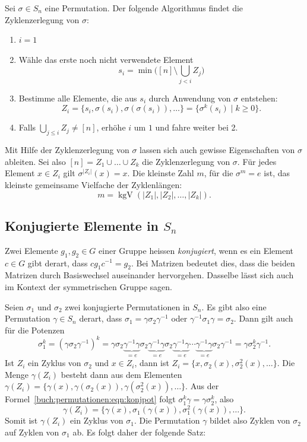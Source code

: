 \begin{satz}
Sei $\sigma\in S_n$ eine Permutation. Der folgende Algorithmus findet
die Zyklenzerlegung von $\sigma$:
\begin{enumerate}
\item
$i=1$
\item
Wähle das erste noch nicht verwendete Element
\[
s_i=\min\biggl( [n] \setminus \bigcup_{j< i} Z_j\biggr)
\]
\item
Bestimme alle Elemente, die aus $s_i$ durch Anwendung von $\sigma$
entstehen:
\[
Z_i
=
\{ s_i, \sigma(s_i), \sigma(\sigma(s_i)), \dots \}
=
\{\sigma^k(s_i) \mid k\ge 0\}.
\]
\item
Falls $\bigcup_{j\le i} Z_j\ne [n]$, erhöhe $i$ um $1$ und fahre 
weiter bei 2.
\end{enumerate}
\end{satz}

Mit Hilfe der Zyklenzerlegung von $\sigma$ lassen sich auch
gewisse Eigenschaften von $\sigma$ ableiten.
Sei also $[n] = Z_1\cup\dots\cup Z_k$ die Zyklenzerlegung von $\sigma$.
Für jedes Element $x\in Z_i$ gilt $\sigma^{|Z_i|}(x) = x$.
Die kleinste Zahl $m$, für die $\sigma^m=e$ ist, das kleinste
gemeinsame Vielfache der Zyklenlängen:
\[
m = \operatorname{kgV} (|Z_1|,|Z_2|,\dots,|Z_k|).
\]

\subsection{Konjugierte Elemente in $S_n$}
Zwei Elemente $g_1,g_2\in G$ einer Gruppe heissen {\em konjugiert}, wenn
es ein Element $c\in G$ gibt derart, dass $cg_1c^{-1}=g_2$.
Bei Matrizen bedeutet dies, dass die beiden Matrizen durch
Basiswechsel auseinander hervorgehen.
Dasselbe lässt sich auch im Kontext der symmetrischen Gruppe sagen.

Seien $\sigma_1$ und $\sigma_2$ zwei konjugierte Permutationen in $S_n$.
Es gibt also eine Permutation $\gamma\in S_n$ derart, dass
$\sigma_1=\gamma\sigma_2\gamma^{-1}$ oder $\gamma^{-1}\sigma_1\gamma=\sigma_2$.
Dann gilt auch für die Potenzen
\begin{equation}
\sigma_1^k
=
(\gamma\sigma_2\gamma^{-1})^k
=
\gamma\sigma_2\underbrace{\gamma^{-1}
\gamma}_{\displaystyle=e}\sigma_2\underbrace{\gamma^{-1}
\gamma}_{\displaystyle=e}\sigma_2\underbrace{\gamma^{-1}\gamma}_{\displaystyle=e}
\cdots
\underbrace{\gamma^{-1}
\gamma}_{\displaystyle=e}\sigma_2\gamma^{-1}
=
\gamma\sigma_2^k\gamma^{-1}.
\label{buch:permutationen:eqn:konjpot}
\end{equation}
Ist $Z_i$ ein Zyklus von $\sigma_2$ und $x\in Z_i$, dann ist
$Z_i = \{ x,\sigma_2(x),\sigma_2^2(x),\dots\}$.
Die Menge $\gamma(Z_i)$ besteht dann aus dem Elementen
$\gamma(Z_i)=\{\gamma(x),\gamma(\sigma_2(x)),\gamma(\sigma_2^2(x)),\dots\}$.
Aus der Formel~\eqref{buch:permutationen:eqn:konjpot} folgt
$\sigma_1^k\gamma = \gamma\sigma_2^k$, also
\[
\gamma(Z_i)
=
\{\gamma(x),\sigma_1(\gamma(x)),\sigma_1^2(\gamma(x)),\dots\}.
\]
Somit ist $\gamma(Z_i)$ ein Zyklus von $\sigma_1$.
Die Permutation $\gamma$ bildet also Zyklen von $\sigma_2$ auf Zyklen
von $\sigma_1$ ab.
Es folgt daher der folgende Satz:

